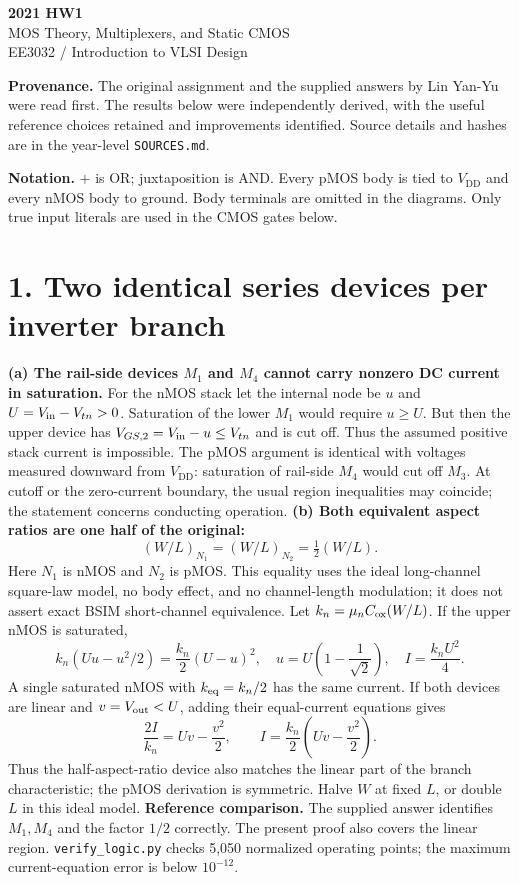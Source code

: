 \documentclass[11pt,a4paper]{article}
\newcommand{\VDD}{V_{\mathrm{DD}}}
\begin{document}
\begin{center}{\LARGE\bfseries 2021 HW1}\\[4pt]{\large MOS Theory, Multiplexers, and Static CMOS}\\[4pt]{\small EE3032 / Introduction to VLSI Design}\end{center}
\textbf{Provenance.} The original assignment and the supplied answers by Lin Yan-Yu were read first. The results below were independently derived, with the useful reference choices retained and improvements identified. Source details and hashes are in the year-level \texttt{SOURCES.md}.

\textbf{Notation.} $+$ is OR; juxtaposition is AND. Every pMOS body is tied to $\VDD$ and every nMOS body to ground. Body terminals are omitted in the diagrams. Only true input literals are used in the CMOS gates below.
\section*{1. Two identical series devices per inverter branch}
\textbf{(a) The rail-side devices $M_1$ and $M_4$ cannot carry nonzero DC current in saturation.}
For the nMOS stack let the internal node be $u$ and $U=V_{\rm in}-V_{tn}>0$.
Saturation of the lower $M_1$ would require $u\ge U$. But then the upper device has
$V_{GS,2}=V_{\rm in}-u\le V_{tn}$ and is cut off. Thus the assumed positive stack current is impossible. The pMOS argument is identical with voltages measured downward from $\VDD$: saturation of rail-side $M_4$ would cut off $M_3$.
At cutoff or the zero-current boundary, the usual region inequalities may coincide; the statement concerns conducting operation.
\textbf{(b) Both equivalent aspect ratios are one half of the original:}
\[
 \boxed{(W/L)_{N_1}=(W/L)_{N_2}=\tfrac12(W/L).}
\]
Here $N_1$ is nMOS and $N_2$ is pMOS. This equality uses the ideal long-channel square-law model, no body effect, and no channel-length modulation; it does not assert exact BSIM short-channel equivalence.
Let $k_n=\mu_n C_{\rm ox}(W/L)$. If the upper nMOS is saturated,
\[
 k_n(Uu-u^2/2)=\frac{k_n}{2}(U-u)^2,
 \quad u=U\left(1-\frac1{\sqrt2}\right),
 \quad I=\frac{k_nU^2}{4}.
\]
A single saturated nMOS with $k_{\rm eq}=k_n/2$ has the same current. If both devices are linear and $v=V_{\rm out}<U$, adding their equal-current equations gives
\[
 \frac{2I}{k_n}=Uv-\frac{v^2}{2},\qquad
 I=\frac{k_n}{2}\left(Uv-\frac{v^2}{2}\right).
\]
Thus the half-aspect-ratio device also matches the linear part of the branch characteristic; the pMOS derivation is symmetric. Halve $W$ at fixed $L$, or double $L$ in this ideal model.
\textbf{Reference comparison.} The supplied answer identifies $M_1,M_4$ and the factor $1/2$ correctly. The present proof also covers the linear region. \texttt{verify\_logic.py} checks 5,050 normalized operating points; the maximum current-equation error is below $10^{-12}$.
\newpage
\end{document}
